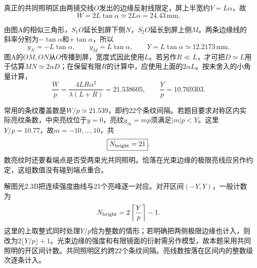 \documentclass[UTF8,fontset=fandol,a4paper,11pt]{ctexart}
\begin{document}
真正的共同照明区由两镜交线$O$发出的边缘反射线限定，屏上半宽约$Y=L\alpha$，故
\[
W=2L\tan\alpha\simeq2L\alpha=24.43\,\mathrm{mm}.
\]

由图A的相似三角形，$S_1O$延长到屏下侧$N$，$S_2O$延长到屏上侧$M$。两条边缘线的斜率分别为$-\tan\alpha$和$+\tan\alpha$，所以
\[
y_N=-L\tan\alpha,\qquad y_M=L\tan\alpha,\qquad
Y=L\tan\alpha\simeq12.2173\,\mathrm{mm}.
\]
图A的$OM,ON$从$O$传播到屏，宽度式因此使用$L$。若另作$R\ll L$，才可把$D\simeq L$用于估算$MN\simeq2\alpha D$；在保留有限$R$的计算中，应使用上面的$2\alpha L$。按未舍入的小角量计算，
\[
\frac Wp=\frac{4LR\alpha^2}{\lambda(L+R)}
=21.538605,\qquad \frac Yp=10.769303.
\]

常用的条纹覆盖数是$W/p\simeq21.539$，即约22个条纹间隔。若题目要求对称区内实际亮纹条数，中央亮纹位于$y=0$，亮纹$y_m=mp$须满足$|m|p<Y$。这里$Y/p=10.77$，故$m=-10,\ldots,10$，共
\[
\boxed{N_{\rm bright}=21}.
\]
数亮纹时还要看端点是否受两束光共同照明。恰落在光束边缘的极限亮线应另作约定，这组数值没有碰到端点重合。


解图光2.3B把连续强度曲线与21个亮峰逐一对应。对开区间$(-Y,Y)$，一般计数为
\[
N_{\rm bright}=2\left\lceil\frac Yp\right\rceil-1.
\]
这里的上取整式同时处理$Y/p$恰为整数的情形；若明确把两侧极限边缘也计入，则改为$2\lfloor Y/p\rfloor+1$。光束边缘的强度和有限镜面的衍射需另作模型，故本题采用共同照明的开区间计数。共同照明区约跨22个条纹间隔。亮线数按落在区间内的整数级次逐条计入。
\end{document}
